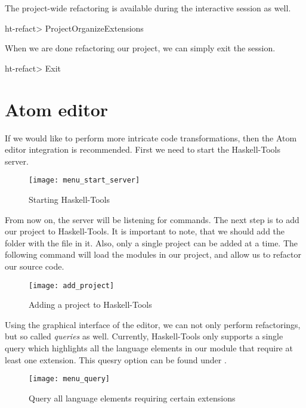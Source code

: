 \documentclass[main.tex]{subfiles}
\begin{document}
	The project-wide refactoring is available during the interactive session as well.
	
	\begin{bash}
		ht-refact> ProjectOrganizeExtensions
	\end{bash}
	
	When we are done refactoring our project, we can simply exit the session.
	
	\begin{bash}
		ht-refact> Exit
	\end{bash}
	
	\section{Atom editor}
	
	If we would like to perform more intricate code transformations, then the Atom editor integration is recommended. First we need to start the Haskell-Tools server.
	
	\begin{figure}[H]
		\hspace{-1cm}
		\centering
		\texttt{[image: menu\_start\_server]}
		\caption{Starting Haskell-Tools}
		\label{fig:menu_start_server}
	\end{figure}
	
	From now on, the server will be listening for commands. The next step is to add our project to Haskell-Tools. It is important to note, that we should add the folder with the  file in it. Also, only a single project can be added at a time. The following command will load the modules in our project, and allow us to refactor our source code.
	
	\begin{figure}[H]
		\hspace{-1cm}
		\centering
		\texttt{[image: add\_project]}
		\caption{Adding a project to Haskell-Tools}
		\label{fig:add_project}
	\end{figure}
	
	Using the graphical interface of the editor, we can not only perform refactorings, but so called \emph{queries} as well. Currently, Haskell-Tools only supports a single query which highlights all the language elements in our module that require at least one extension. This quesry option can be found under .
	
	\begin{figure}[H]
		\hspace{-1cm}
		\centering
		\texttt{[image: menu\_query]}
		\caption{Query all language elements requiring certain extensions}
		\label{fig:menu_query}
	\end{figure}
	
\end{document}

